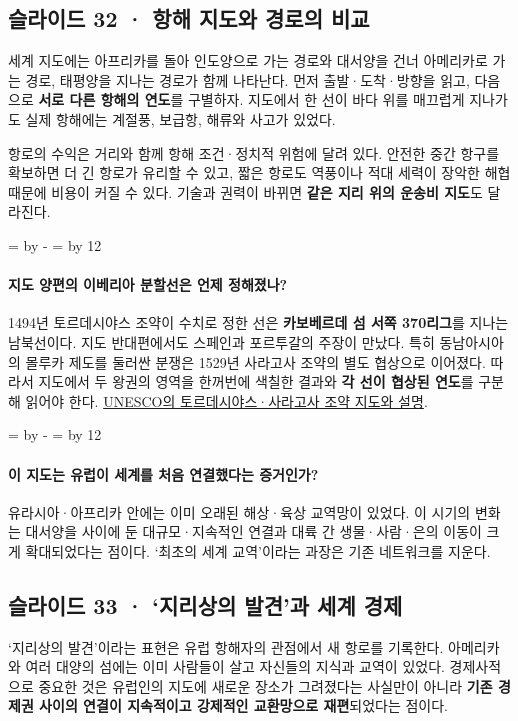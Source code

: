 \documentclass[10pt,a4paper]{article}
\newcommand{\ReserveQuestionSpace}{%
  \par\begingroup
  \dimen0=\pagegoal \advance\dimen0 by -\pagetotal
  \dimen2=\baselineskip \multiply\dimen2 by 12
  \ifdim\dimen0<\dimen2 \newpage\fi
  \endgroup}
\begin{document}
\subsection{슬라이드 32 · 항해 지도와 경로의 비교}
세계 지도에는 아프리카를 돌아 인도양으로 가는 경로와 대서양을 건너 아메리카로 가는 경로, 태평양을 지나는 경로가 함께 나타난다. 먼저 출발·도착·방향을 읽고, 다음으로 \textbf{서로 다른 항해의 연도}를 구별하자. 지도에서 한 선이 바다 위를 매끄럽게 지나가도 실제 항해에는 계절풍, 보급항, 해류와 사고가 있었다.\par

항로의 수익은 거리와 함께 항해 조건·정치적 위험에 달려 있다. 안전한 중간 항구를 확보하면 더 긴 항로가 유리할 수 있고, 짧은 항로도 역풍이나 적대 세력이 장악한 해협 때문에 비용이 커질 수 있다. 기술과 권력이 바뀌면 \textbf{같은 지리 위의 운송비 지도}도 달라진다.\par

\ReserveQuestionSpace
\paragraph{지도 양편의 이베리아 분할선은 언제 정해졌나?}
1494년 토르데시야스 조약이 수치로 정한 선은 \textbf{카보베르데 섬 서쪽 370리그}를 지나는 남북선이다. 지도 반대편에서도 스페인과 포르투갈의 주장이 만났다. 특히 동남아시아의 몰루카 제도를 둘러싼 분쟁은 1529년 사라고사 조약의 별도 협상으로 이어졌다. 따라서 지도에서 두 왕권의 영역을 한꺼번에 색칠한 결과와 \textbf{각 선이 협상된 연도}를 구분해 읽어야 한다. \href{https://www.unesco.org/sites/default/files/medias/fichiers/2025/10/MoWSchoolKit2021Part3.pdf}{UNESCO의 토르데시야스·사라고사 조약 지도와 설명}.\par

\ReserveQuestionSpace
\paragraph{이 지도는 유럽이 세계를 처음 연결했다는 증거인가?}
유라시아·아프리카 안에는 이미 오래된 해상·육상 교역망이 있었다. 이 시기의 변화는 대서양을 사이에 둔 대규모·지속적인 연결과 대륙 간 생물·사람·은의 이동이 크게 확대되었다는 점이다. ‘최초의 세계 교역’이라는 과장은 기존 네트워크를 지운다.\par

\subsection{슬라이드 33 · ‘지리상의 발견’과 세계 경제}
‘지리상의 발견’이라는 표현은 유럽 항해자의 관점에서 새 항로를 기록한다. 아메리카와 여러 대양의 섬에는 이미 사람들이 살고 자신들의 지식과 교역이 있었다. 경제사적으로 중요한 것은 유럽인의 지도에 새로운 장소가 그려졌다는 사실만이 아니라 \textbf{기존 경제권 사이의 연결이 지속적이고 강제적인 교환망으로 재편}되었다는 점이다.\par
\end{document}
